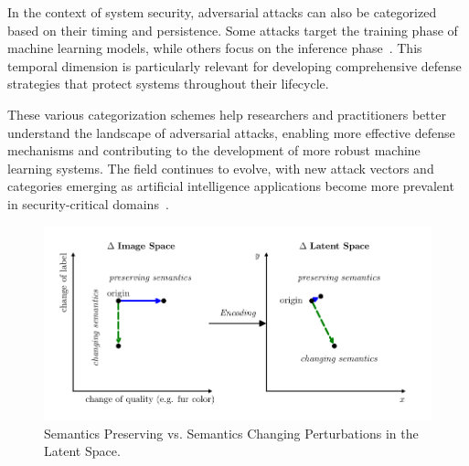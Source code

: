 \documentclass[a4paper, oneside]{discothesis}
\begin{document}
In the context of system security, adversarial attacks can also be categorized based on their timing and persistence. Some attacks target the training phase of machine learning models, while others focus on the inference phase~\cite{Kashyap2024AdversarialAA}. This temporal dimension is particularly relevant for developing comprehensive defense strategies that protect systems throughout their lifecycle.

These various categorization schemes help researchers and practitioners better understand the landscape of adversarial attacks, enabling more effective defense mechanisms and contributing to the development of more robust machine learning systems. The field continues to evolve, with new attack vectors and categories emerging as artificial intelligence applications become more prevalent in security-critical domains~\cite{Khaleel2024AdversarialAI}.


\newpage







\begin{figure}
    \centering
    \includegraphics[width=1\columnwidth]{assets/latentspace.pdf}
    \caption{Semantics Preserving vs. Semantics Changing Perturbations in the Latent Space.}
    \label{fig:latentspace}
\end{figure}
\end{document}
